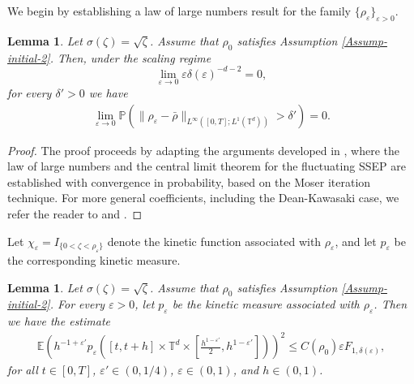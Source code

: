 \documentclass[UTF-8,reqno]{amsart}
\numberwithin{equation}{section}
\newtheorem{lemma}[theorem]{Lemma}
\def\leq{\leqslant}
\def\leq{\leqslant}
\begin{document}
We begin by establishing a law of large numbers result for the family $\{\rho_\varepsilon\}_{\varepsilon>0}$.

\begin{lemma}\label{LLN-irregular}
Let $\sigma(\zeta)=\sqrt{\zeta}$. Assume that $\rho_0$ satisfies Assumption \ref{Assump-initial-2}. Then, under the scaling regime $$\lim_{\varepsilon\rightarrow0}\varepsilon\delta(\varepsilon)^{-d-2}=0,$$ for every $\delta' > 0$ we have
\begin{align*}
\lim_{\varepsilon \rightarrow 0} \mathbb{P} \left( \|\rho_{\varepsilon} - \bar{\rho}\|_{L^{\infty}([0,T]; L^1(\mathbb{T}^d))} > \delta' \right) = 0.
\end{align*}
\end{lemma}

\begin{proof}
The proof proceeds by adapting the arguments developed in \cite[Proposition~3.5 and Theorems~3.9, 3.10]{DFG}, where the law of large numbers and the central limit theorem for the fluctuating SSEP are established with convergence in probability, based on the Moser iteration technique. For more general coefficients, including the Dean-Kawasaki case, we refer the reader to \cite{GWZ24} and \cite{CF23}. 
\end{proof}
Let $\chi_{\varepsilon} = I_{\{0 < \zeta < \rho_{\varepsilon}\}}$ denote the kinetic function associated with $\rho_\varepsilon$, and let $p_{\varepsilon}$ be the corresponding kinetic measure.

\begin{lemma}\label{boundedness-kineticmeasure}
Let $\sigma(\zeta)=\sqrt{\zeta}$. Assume that $\rho_0$ satisfies Assumption \ref{Assump-initial-2}. For every $\varepsilon > 0$, let $p_{\varepsilon}$ be the kinetic measure associated with $\rho_\varepsilon$. Then we have the estimate
\begin{align*}
\mathbb{E}\left(h^{-1 + \varepsilon'} p_{\varepsilon}\left([t, t + h] \times \mathbb{T}^d \times \left[\frac{h^{1 - \varepsilon'}}{2}, h^{1 - \varepsilon'}\right]\right)\right)^2 \leq C(\rho_0)\varepsilon F_{1,\delta(\varepsilon)},
\end{align*}
for all $t \in [0, T]$, $\varepsilon' \in (0, 1/4)$, $\varepsilon \in (0, 1)$, and $h \in (0, 1)$. 
\end{lemma}
\end{document}
